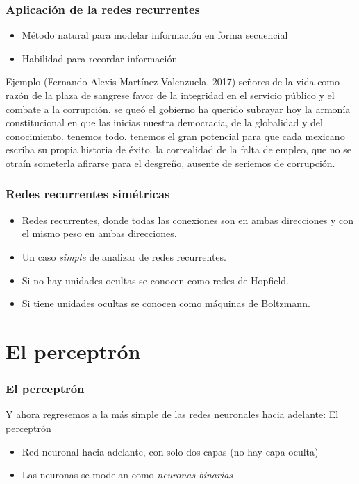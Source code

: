 \documentclass{beamer}
\begin{document}
\begin{frame}
  \frametitle{Aplicación de la redes recurrentes}
  \begin{itemize}
  \item Método natural para modelar información en forma secuencial
  \item Habilidad para recordar información
  \end{itemize}
  \begin{block}{Ejemplo (Fernando Alexis Martínez Valenzuela, 2017)}
    señores de la vida como razón de la plaza de sangrese favor de la
    integridad en el servicio público y el combate a la corrupción. se
    queó el gobierno ha querido subrayar hoy la armonía constitucional
    en que las inicias nuestra democracia, de la globalidad y del
    conocimiento. tenemos todo. tenemos el gran potencial para que
    cada mexicano escriba su propia historia de éxito. la correalidad
    de la falta de empleo, que no se otraín someterla afirarse para el
    desgreño, ausente de seriemos de corrupción.
  \end{block}
\end{frame}

\begin{frame}
  \frametitle{Redes recurrentes simétricas}

  \begin{itemize}
  \item Redes recurrentes, donde todas las conexiones son en ambas
    direcciones y con el mismo peso en ambas direcciones.
  \item Un caso \emph{simple} de analizar de redes recurrentes.
  \item Si no hay unidades ocultas se conocen como \alert{redes de
      Hopfield}.
  \item Si tiene unidades ocultas se conocen como \alert{máquinas de
      Boltzmann}.
  \end{itemize}
\end{frame}

\section{El perceptrón}

\begin{frame}
  \frametitle{El perceptrón}
  \begin{block}{}
    Y ahora regresemos a la más simple de las redes neuronales hacia
    adelante: \alert{El perceptrón}
  \end{block}

\begin{itemize}
\item Red neuronal hacia adelante, con solo dos capas (no hay capa
  oculta)
\item Las neuronas se modelan como \emph{neuronas binarias}
\end{itemize}

\end{frame}
\end{document}

